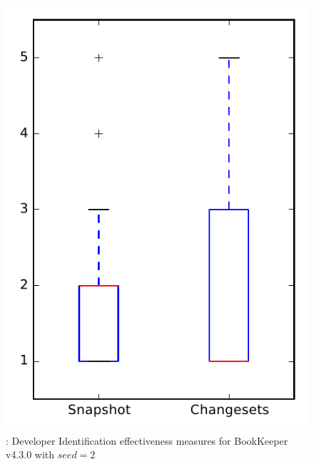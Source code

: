 
\begin{figure}
\centering
\includegraphics[height=0.4\textheight]{figures/dit_seed/rq1_bookkeeper_2}
\caption{\rtwo: Developer Identification effectiveness measures for BookKeeper v4.3.0 with $seed=2$}
\label{fig:dit_seed:rq1:bookkeeper}
\end{figure}
